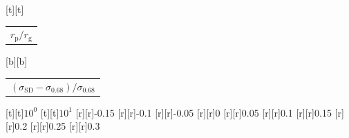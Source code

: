 %    
%
%
\begin{psfrags}%
\psfragscanon%
%
[t][t]{\color[rgb]{0,0,0}\setlength{\tabcolsep}{0pt}\begin{tabular}{c}{\Large$r_\mathrm{p}/r_\mathrm{g}$}\end{tabular}}%
[b][b]{\color[rgb]{0,0,0}\setlength{\tabcolsep}{0pt}\begin{tabular}{c}{\Large$(\sigma_\mathrm{SD}-\sigma_{0.68})/\sigma_{0.68}$}\end{tabular}}%
%
[t][t]{$10^{0}$}%
[t][t]{$10^{1}$}%
%
[r][r]{-0.15}%
[r][r]{-0.1}%
[r][r]{-0.05}%
[r][r]{0}%
[r][r]{0.05}%
[r][r]{0.1}%
[r][r]{0.15}%
[r][r]{0.2}%
[r][r]{0.25}%
[r][r]{0.3}%
%
%
\end{psfrags}%
%
